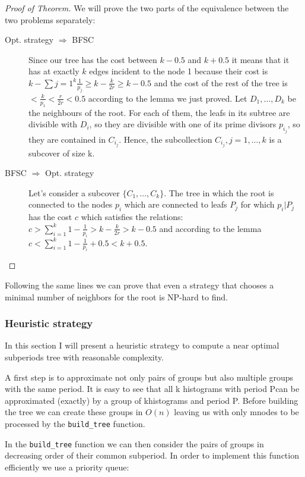 \begin{proof}[Proof of Theorem]
We will prove the two parts of the equivalence between the two problems separately:
\begin{description}
\item[Opt. strategy $\Rightarrow$ BFSC] 
Since our tree has the cost between $k-0.5$ and $k+0.5$ it means that it has at exactly $k$ edges incident to the node 1 because their cost is $k-\sum{j=1}^k \frac 1 {p_j} \geq k-\frac k {2r} \geq k-0.5$ and the cost of the rest of the tree is $ <\frac k {p_1}< \frac r{2r}<0.5$ according to the lemma we just proved. Let $D_1, \ldots, D_k$ be the neighbours of the root. For each of them, the leafs in its subtree are divisible with $D_i$, so they are divisible with one of its prime divisors $p_{i_j}$, so they are contained in $C_{i_j}$. Hence, the subcollection $C_{i_j},j=1,\ldots,k$ is a subcover of size k.

\item[BFSC $\Rightarrow$ Opt. strategy] Let’s consider a subcover $\{C_1,\ldots,C_k\}$. The tree in which the root is connected to the nodes $p_i$ which are connected to leafs $P_j$ for which $p_i \vert P_j$ has the cost $c$ which satisfies the relations: $c > \sum_{i=1}^k 1-\frac 1{p_i} > k-\frac k{2r}>k-0.5$ and according to the lemma $c<\sum_{i=1}^k 1-\frac 1{p_i}+0.5<k+0.5$.
\end{description}\end{proof}
 
Following the same lines we can prove that even a strategy that chooses a minimal number of neighbors for the root is NP-hard to find.

\subsubsection*{Heuristic strategy}

In this section I will present a heuristic strategy to compute a near optimal subperiods tree with reasonable complexity. 

A first step is to approximate not only pairs of groups but also multiple groups with the same period. It is easy to see that all k histograms with period Pcan be approximated (exactly) by a group of khistograms and period P. Before building the tree we can create these groups in $O(n)$ leaving us with only mnodes to be processed by the \verb+build_tree+ function. 

In the \verb+build_tree+ function we can then consider the pairs of groups in decreasing order of their common subperiod. In order to implement this function efficiently we use a priority queue:

